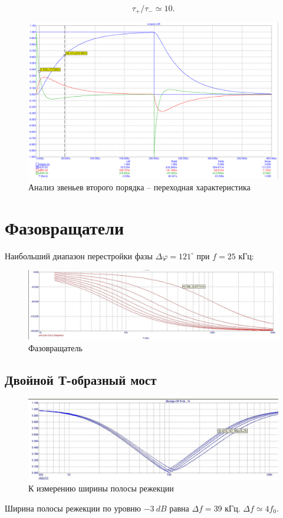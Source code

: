 \documentclass[a4paper, 12pt]{article}
\begin{document}
$$\tau_+ / \tau_- \simeq 10.$$
\begin{figure}[H]
\centering
\includegraphics[width=1\textwidth]{rcpoletran}
\caption{Анализ звеньев второго порядка -- переходная характеристика}
\end{figure}

\section*{Фазовращатели}
Наибольший диапазон перестройки фазы $\Delta \varphi = 121^\circ$ при $f=25$ кГц:
\begin{figure}[H]
\centering
\includegraphics[width=1\textwidth]{phsshift}
\caption{Фазовращатель}
\end{figure}

\subsection*{Двойной Т-образный мост}
\begin{figure}[H]
\centering
\includegraphics[width=1\textwidth]{2tbridge}
\caption{К измерению ширины полосы режекции}
\end{figure}
Ширина полосы режекции по уровню $-3\ dB$ равна $\Delta f = 39$ кГц. $\Delta f  \simeq 4f_0$.
\end{document}
